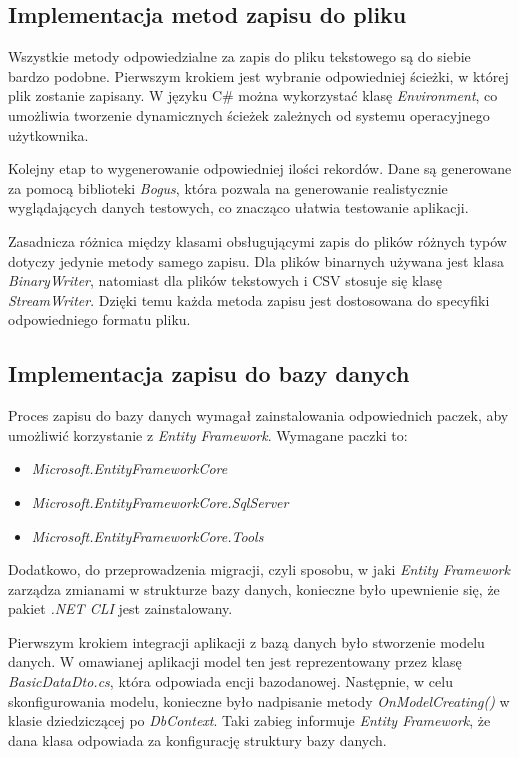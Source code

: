 \documentclass{report}
\begin{document}
\subsection{\Large Implementacja metod zapisu do pliku}

Wszystkie metody odpowiedzialne za zapis do pliku tekstowego są do siebie bardzo podobne. Pierwszym krokiem jest wybranie odpowiedniej ścieżki, w której plik zostanie zapisany. W języku C\# można wykorzystać klasę \textit{Environment}, co umożliwia tworzenie dynamicznych ścieżek zależnych od systemu operacyjnego użytkownika.

Kolejny etap to wygenerowanie odpowiedniej ilości rekordów. Dane są generowane za pomocą biblioteki \textit{Bogus}, która pozwala na generowanie realistycznie wyglądających danych testowych, co znacząco ułatwia testowanie aplikacji.

Zasadnicza różnica między klasami obsługującymi zapis do plików różnych typów dotyczy jedynie metody samego zapisu. Dla plików binarnych używana jest klasa \textit{BinaryWriter}, natomiast dla plików tekstowych i CSV stosuje się klasę \textit{StreamWriter}. Dzięki temu każda metoda zapisu jest dostosowana do specyfiki odpowiedniego formatu pliku.

\subsection{\Large Implementacja zapisu do bazy danych}

Proces zapisu do bazy danych wymagał zainstalowania odpowiednich paczek, aby umożliwić korzystanie z \textit{Entity Framework}. Wymagane paczki to: 
\begin{itemize} 
    \item \textit{Microsoft.EntityFrameworkCore} 
    \item \textit{Microsoft.EntityFrameworkCore.SqlServer} 
    \item \textit{Microsoft.EntityFrameworkCore.Tools} 
\end{itemize}

Dodatkowo, do przeprowadzenia migracji, czyli sposobu, w jaki \textit{Entity Framework} zarządza zmianami w strukturze bazy danych, konieczne było upewnienie się, że pakiet \textit{.NET CLI} jest zainstalowany.

Pierwszym krokiem integracji aplikacji z bazą danych było stworzenie modelu danych. W omawianej aplikacji model ten jest reprezentowany przez klasę \textit{BasicDataDto.cs}, która odpowiada encji bazodanowej. Następnie, w celu skonfigurowania modelu, konieczne było nadpisanie metody \textit{OnModelCreating()} w klasie dziedziczącej po \textit{DbContext}. Taki zabieg informuje \textit{Entity Framework}, że dana klasa odpowiada za konfigurację struktury bazy danych.
\end{document}
